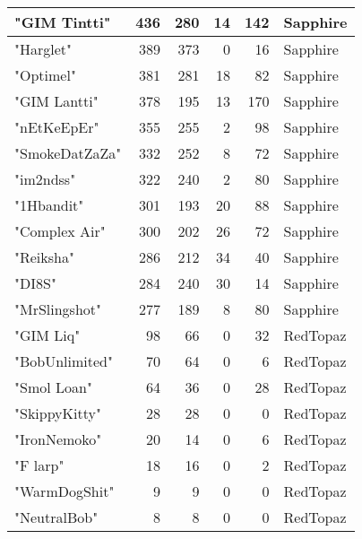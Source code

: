 \documentclass{article}
\begin{document}
\begin{table}[htbp]
\begin{tabular}{|l|r|r|r|r|l|}
"GIM Tintti" & 436 & 280 & 14 & 142 & Sapphire \\ \hline
"Harglet" & 389 & 373 & 0 & 16 & Sapphire \\ \hline
"Optimel" & 381 & 281 & 18 & 82 & Sapphire \\ \hline
"GIM Lantti" & 378 & 195 & 13 & 170 & Sapphire \\ \hline
"nEtKeEpEr" & 355 & 255 & 2 & 98 & Sapphire \\ \hline
"SmokeDatZaZa" & 332 & 252 & 8 & 72 & Sapphire \\ \hline
"im2ndss" & 322 & 240 & 2 & 80 & Sapphire \\ \hline
"1Hbandit" & 301 & 193 & 20 & 88 & Sapphire \\ \hline
"Complex Air" & 300 & 202 & 26 & 72 & Sapphire \\ \hline
"Reiksha" & 286 & 212 & 34 & 40 & Sapphire \\ \hline
"DI8S" & 284 & 240 & 30 & 14 & Sapphire \\ \hline
"MrSlingshot" & 277 & 189 & 8 & 80 & Sapphire \\ \hline
"GIM Liq" & 98 & 66 & 0 & 32 & RedTopaz \\ \hline
"BobUnlimited" & 70 & 64 & 0 & 6 & RedTopaz \\ \hline
"Smol Loan" & 64 & 36 & 0 & 28 & RedTopaz \\ \hline
"SkippyKitty" & 28 & 28 & 0 & 0 & RedTopaz \\ \hline
"IronNemoko" & 20 & 14 & 0 & 6 & RedTopaz \\ \hline
"F larp" & 18 & 16 & 0 & 2 & RedTopaz \\ \hline
"WarmDogShit" & 9 & 9 & 0 & 0 & RedTopaz \\ \hline
"NeutralBob" & 8 & 8 & 0 & 0 & RedTopaz \\ \hline
\end{tabular}
\end{table}
\end{document}
